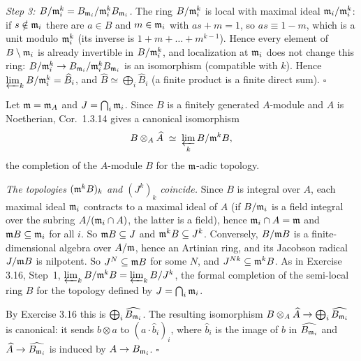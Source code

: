 \documentclass[11pt]{article}
\begin{document}
\emph{Step 3: $B/\mathfrak m_i^k=B_{\mathfrak m_i}/\mathfrak m_i^kB_{\mathfrak m_i}$.} The ring $B/\mathfrak m_i^k$ is local with maximal ideal $\mathfrak m_i/\mathfrak m_i^k$: if $s\notin\mathfrak m_i$ there are $a\in B$ and $m\in\mathfrak m_i$ with $as+m=1$, so $as\equiv1-m$, which is a unit modulo $\mathfrak m_i^k$ (its inverse is $1+m+\dots+m^{k-1}$). Hence every element of $B\setminus\mathfrak m_i$ is already invertible in $B/\mathfrak m_i^k$, and localization at $\mathfrak m_i$ does not change this ring: $B/\mathfrak m_i^k\to B_{\mathfrak m_i}/\mathfrak m_i^kB_{\mathfrak m_i}$ is an isomorphism (compatible with $k$). Hence $\varprojlim_kB/\mathfrak m_i^k=\widehat B_i$, and $\widehat B\simeq\bigoplus_i\widehat B_i$ (a finite product is a finite direct sum). \hfill$\square$

\pf
Let $\mathfrak m=\mathfrak m_A$ and $J=\bigcap_i\mathfrak m_i$. Since $B$ is a finitely generated $A$-module and $A$ is Noetherian, Cor.~1.3.14 gives a canonical isomorphism
\[ B\otimes_A\widehat A\;\simeq\;\varprojlim_kB/\mathfrak m^kB, \]
the completion of the $A$-module $B$ for the $\mathfrak m$-adic topology.

\emph{The topologies $(\mathfrak m^kB)_k$ and $(J^k)_k$ coincide.} Since $B$ is integral over $A$, each maximal ideal $\mathfrak m_i$ contracts to a maximal ideal of $A$ (if $B/\mathfrak m_i$ is a field integral over the subring $A/(\mathfrak m_i\cap A)$, the latter is a field), hence $\mathfrak m_i\cap A=\mathfrak m$ and $\mathfrak m B\subseteq\mathfrak m_i$ for all $i$. So $\mathfrak m B\subseteq J$ and $\mathfrak m^kB\subseteq J^k$. Conversely, $B/\mathfrak m B$ is a finite-dimensional algebra over $A/\mathfrak m$, hence an Artinian ring, and its Jacobson radical $J/\mathfrak m B$ is nilpotent. So $J^N\subseteq\mathfrak m B$ for some $N$, and $J^{Nk}\subseteq\mathfrak m^kB$. As in Exercise 3.16, Step~1, $\varprojlim_kB/\mathfrak m^kB=\varprojlim_kB/J^k$, the formal completion of the semi-local ring $B$ for the topology defined by $J=\bigcap_i\mathfrak m_i$.

By Exercise 3.16 this is $\bigoplus_i\widehat{B_{\mathfrak m_i}}$. The resulting isomorphism $B\otimes_A\widehat A\to\bigoplus_i\widehat{B_{\mathfrak m_i}}$ is canonical: it sends $b\otimes a$ to $(a\cdot\hat b_i)_i$, where $\hat b_i$ is the image of $b$ in $\widehat{B_{\mathfrak m_i}}$ and $\widehat A\to\widehat{B_{\mathfrak m_i}}$ is induced by $A\to B_{\mathfrak m_i}$. \hfill$\square$
\end{document}
